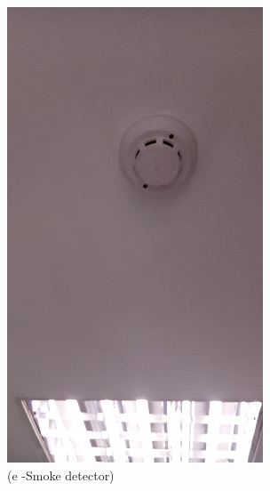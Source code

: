 \begin{figure}
\begin{minipage}[b]{0.2\linewidth}
		\includegraphics[width=\textwidth]{figures/R1P_fdas/smokedetector}
	\caption*{(e -Smoke detector)}
\end{minipage}
	\hspace{0.05cm}
\begin{minipage}[b]{0.2\linewidth}
	\centering

\end{minipage}
\end{figure}

